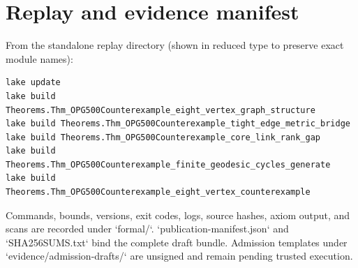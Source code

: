 \documentclass[11pt]{amsart}
\theoremstyle{definition}
\begin{document}
\section{Replay and evidence manifest}

From the standalone replay directory (shown in reduced type to preserve exact module names):
\begin{scriptsize}
\begin{verbatim}
lake update
lake build Theorems.Thm_OPG500Counterexample_eight_vertex_graph_structure
lake build Theorems.Thm_OPG500Counterexample_tight_edge_metric_bridge
lake build Theorems.Thm_OPG500Counterexample_core_link_rank_gap
lake build Theorems.Thm_OPG500Counterexample_finite_geodesic_cycles_generate
lake build Theorems.Thm_OPG500Counterexample_eight_vertex_counterexample
\end{verbatim}
\end{scriptsize}
Commands, bounds, versions, exit codes, logs, source hashes, axiom output, and scans are recorded under `formal/`.  `publication-manifest.json` and `SHA256SUMS.txt` bind the complete draft bundle.  Admission templates under `evidence/admission-drafts/` are unsigned and remain pending trusted execution.



\end{document}
